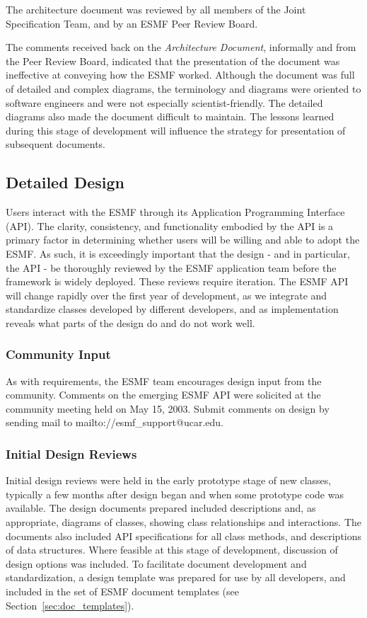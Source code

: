 The architecture document was reviewed by all members of the Joint
Specification Team, and by an ESMF Peer Review Board.

The comments received back on the {\it Architecture Document}, informally and
from the Peer Review Board, indicated that the presentation of the document
was ineffective at conveying how the ESMF worked. Although the 
document was full of detailed and complex diagrams, the terminology and 
diagrams were oriented to software engineers and were not especially
scientist-friendly.  The detailed diagrams also made the document difficult 
to maintain.  The lessons learned during this stage of development will
influence the strategy for presentation of subsequent documents.  

\subsection{Detailed Design}

Users interact with the ESMF through its Application Programming
Interface (API).  The clarity, consistency, and functionality
embodied by the API is a primary factor in determining
whether users will be willing and able to adopt the ESMF.  
As such, it is exceedingly important that the design - and in
particular, the API - be thoroughly reviewed by the ESMF application 
team before the framework is widely deployed.  These reviews require
iteration.  The ESMF API will change rapidly over the first year of 
development, as we integrate and standardize classes
developed by different developers, and as implementation reveals 
what parts of the design do and do not work well.   

\subsubsection{Community Input}

As with requirements, the ESMF team encourages design input from the community.
Comments on the emerging ESMF API were solicited at the community meeting 
held on May 15, 2003.  Submit comments on design by sending mail 
to 
{mailto://esmf\_support@ucar.edu}.

\subsubsection{Initial Design Reviews}

Initial design reviews were held in the early prototype
stage of new classes, typically a few months after design began and 
when some prototype code was available.  The design documents prepared
included descriptions and, as appropriate, diagrams of classes, 
showing class relationships and interactions.  The documents 
also included API specifications for all class methods, and 
descriptions of data structures.  Where feasible at this stage
of development, discussion of design options was included.  To facilitate
document development and standardization, a design template was prepared 
for use by all developers, and included in the set of ESMF document 
templates (see Section~\ref{sec:doc_templates}).  

